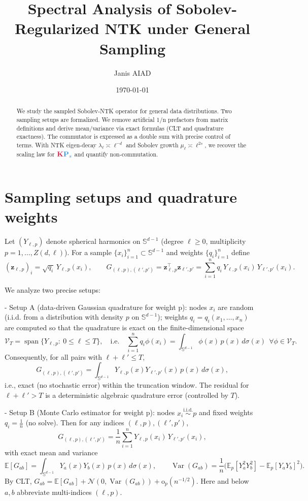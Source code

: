 \documentclass{article}
\title{Spectral Analysis of Sobolev-Regularized NTK under General Sampling}
\author{Janis AIAD}
\date{\today}
\newcommand{\Kmat}{\textcolor{kernelcolor}{\mathbf{K}}}
\newcommand{\Psmat}{\textcolor{sobolevcolor}{\mathbf{P}_s}}
\newcommand{\E}{\mathbb{E}}
\newcommand{\Sphere}{\mathbb{S}^{d-1}}
\begin{document}
\maketitle

\begin{abstract}
We study the sampled Sobolev-NTK operator for general data distributions. Two sampling setups are formalized. We remove artificial 1/n prefactors from matrix definitions and derive mean/variance via exact formulas (CLT and quadrature exactness). The commutator is expressed as a double sum with precise control of terms. With NTK eigen-decay $\lambda_\ell \asymp \ell^{-d}$ and Sobolev growth $\mu_\ell \asymp \ell^{2s}$, we recover the scaling law for $\Kmat\Psmat$ and quantify non-commutation.
\end{abstract}

\section{Sampling setups and quadrature weights}

Let $(Y_{\ell,p})$ denote spherical harmonics on $\Sphere$ (degree $\ell\ge 0$, multiplicity $p=1,\dots,Z(d,\ell)$). For a sample $\{x_i\}_{i=1}^n \subset \Sphere$ and weights $\{q_i\}_{i=1}^n$ define
\[
(\mathbf{z}_{\ell,p})_i=\sqrt{q_i}\,Y_{\ell,p}(x_i),\qquad
G_{(\ell,p),(\ell',p')}=\mathbf{z}_{\ell,p}^{\top}\mathbf{z}_{\ell',p'}=\sum_{i=1}^n q_i\,Y_{\ell,p}(x_i)\,Y_{\ell',p'}(x_i).
\]

We analyze two precise setups:

- Setup A (data-driven Gaussian quadrature for weight p): nodes $x_i$ are random (i.i.d. from a distribution with density $p$ on $\Sphere$); weights $q_i=q_i(x_1,\dots,x_n)$ are computed so that the quadrature is exact on the finite-dimensional space
\[
\mathcal{V}_T=\operatorname{span}\{Y_{\ell,p}:\ 0\le \ell\le T\},\quad\text{i.e.}\quad \sum_{i=1}^n q_i\phi(x_i)=\int_{\Sphere}\phi(x)\,p(x)\,d\sigma(x)\ \ \forall\phi\in\mathcal{V}_T.
\]
Consequently, for all pairs with $\ell+\ell'\le T$,
\[
G_{(\ell,p),(\ell',p')}=\int_{\Sphere} Y_{\ell,p}(x)Y_{\ell',p'}(x)\,p(x)\,d\sigma(x),
\]
i.e., exact (no stochastic error) within the truncation window. The residual for $\ell+\ell'>T$ is a deterministic algebraic quadrature error (controlled by $T$).

- Setup B (Monte Carlo estimator for weight p): nodes $x_i\stackrel{\text{i.i.d.}}{\sim}p$ and fixed weights $q_i=\frac{1}{n}$ (no solve). Then for any indices $(\ell,p),(\ell',p')$,
\[
G_{(\ell,p),(\ell',p')}=\frac{1}{n}\sum_{i=1}^n Y_{\ell,p}(x_i)\,Y_{\ell',p'}(x_i),
\]
with exact mean and variance
\[
\E[G_{ab}]=\int_{\Sphere} Y_{a}(x)Y_{b}(x)\,p(x)\,d\sigma(x),\qquad
\operatorname{Var}(G_{ab})=\frac{1}{n}\Big(\E_p[Y_a^2Y_b^2]-\E_p[Y_aY_b]^2\Big).
\]
By CLT, $G_{ab}=\E[G_{ab}]+\mathcal{N}(0,\operatorname{Var}(G_{ab}))+\mathrm{o}_p(n^{-1/2})$. Here and below $a,b$ abbreviate multi-indices $(\ell,p)$.
\end{document}
